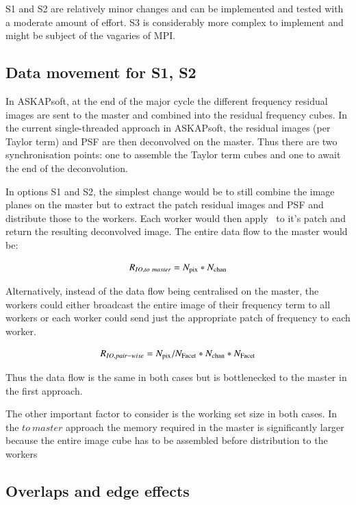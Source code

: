 \documentclass[11pt,a4paper,variablewidth]{article}
\begin{document}
S1 and S2 are relatively minor changes and can be implemented and tested with a moderate amount of effort. S3 is considerably more complex to implement and might be subject of the vagaries of MPI. 

\subsection{Data movement for S1, S2}
\label{sec:data_movement}

In ASKAPsoft, at the end of the major cycle the different frequency residual images are sent to the master and combined into the residual frequency cubes. In the current single-threaded approach in ASKAPsoft, the residual images (per Taylor term) and PSF are then deconvolved on the master. Thus there are two synchronisation points: one to assemble the Taylor term cubes and one to await the end of the deconvolution.

In options S1 and S2, the simplest change would be to still combine the image planes on the master but to extract the patch residual images and PSF and distribute those to the workers. Each worker would then apply \MAM\ to it's patch and return the resulting deconvolved image. The entire data flow to the master would be:

\begin{equation}
	R_{IO,{to\ master}} = N_{\rm pix} * N_{\rm chan}
\end{equation}

Alternatively, instead of the data flow being centralised on the master, the workers could either broadcast the entire image of their frequency term to all workers or each worker could send just the appropriate patch of frequency to each worker.

\begin{equation}
	R_{IO,{pair-wise}} = {N_{\rm pix}/N_{\rm Facet}} * N_{\rm chan} * N_{\rm Facet}
\end{equation}

Thus the data flow is the same in both cases but is bottlenecked to the master in the first approach. 

The other important factor to consider is the working set size in both cases. In the 
${to\ master}$ approach the memory required in the master is significantly larger because the
entire image cube has to be assembled before distribution to the workers

\subsection{Overlaps and edge effects}
\end{document}
